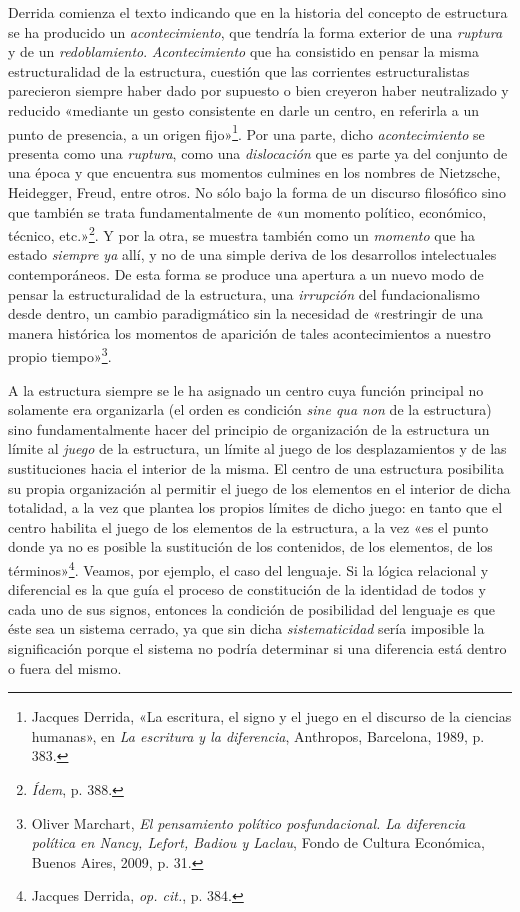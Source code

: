 Derrida comienza el texto indicando que en la historia del concepto de estructura se ha producido un \emph{acontecimiento}, que tendría la forma exterior de una \emph{ruptura} y de un \emph{redoblamiento}. \emph{Acontecimiento} que ha consistido en pensar la misma estructuralidad de la estructura, cuestión que las corrientes estructuralistas parecieron siempre haber dado por supuesto o bien creyeron haber neutralizado y reducido «mediante un gesto consistente en darle un centro, en referirla a un punto de presencia, a un origen fijo»\footnote{Jacques Derrida, «La escritura, el signo y el juego en el discurso de la ciencias humanas», en \emph{La escritura y la diferencia}, Anthropos, Barcelona, 1989, p. 383.}. Por una parte, dicho \emph{acontecimiento} se presenta como una \emph{ruptura}, como una \emph{dislocación} que es parte ya del conjunto de una época y que encuentra sus momentos culmines en los nombres de Nietzsche, Heidegger, Freud, entre otros. No sólo bajo la forma de un discurso filosófico sino que también se trata fundamentalmente de «un momento político, económico, técnico, etc.»\footnote{\emph{Ídem}, p. 388.}. Y por la otra, se muestra también como un \emph{momento} que ha estado \emph{siempre ya} allí, y no de una simple deriva de los desarrollos intelectuales contemporáneos. De esta forma se produce una apertura a un nuevo modo de pensar la estructuralidad de la estructura, una \emph{irrupción} del fundacionalismo desde dentro, un cambio paradigmático sin la necesidad de «restringir de una manera histórica los momentos de aparición de tales acontecimientos a nuestro propio tiempo»\footnote{Oliver Marchart, \emph{El pensamiento político posfundacional. La diferencia política en Nancy, Lefort, Badiou y Laclau}, Fondo de Cultura Económica, Buenos Aires, 2009, p. 31.}.

A la estructura siempre se le ha asignado un centro cuya función principal no solamente era organizarla (el orden es condición \emph{sine qua non} de la estructura) sino fundamentalmente hacer del principio de organización de la estructura un límite al \emph{juego} de la estructura, un límite al juego de los desplazamientos y de las sustituciones hacia el interior de la misma. El centro de una estructura posibilita su propia organización al permitir el juego de los elementos en el interior de dicha totalidad, a la vez que plantea los propios límites de dicho juego: en tanto que el centro habilita el juego de los elementos de la estructura, a la vez «es el punto donde ya no es posible la sustitución de los contenidos, de los elementos, de los términos»\footnote{Jacques Derrida, \emph{op. cit.}, p. 384.}. Veamos, por ejemplo, el caso del lenguaje. Si la lógica relacional y diferencial es la que guía el proceso de constitución de la identidad de todos y cada uno de sus signos, entonces la condición de posibilidad del lenguaje es que éste sea un sistema cerrado, ya que sin dicha \emph{sistematicidad} sería imposible la significación porque el sistema no podría determinar si una diferencia está dentro o fuera del mismo.


